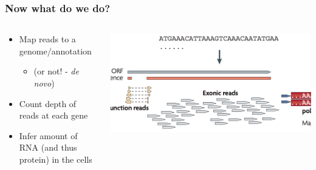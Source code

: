\documentclass[14pt]{beamer}
\begin{document}
\begin{frame}
\frametitle{Now what do we do?}
\begin{columns}
	\begin{column}{0.5\textwidth}
	\begin{itemize}
		\item<+-> Map reads to a genome/annotation
		\begin{itemize}
			\item (or not! - \textit{de novo})
		\end{itemize}
		\item<+-> Count depth of reads at each gene
		\item<+-> Infer amount of RNA (and thus protein) in the cells
	\end{itemize}
	\end{column}
	\begin{column}{0.5\textwidth}
	\begin{center}
    	\includegraphics[width=1\textwidth]{images_20170912_map.png}
    \end{center}
	\end{column}
\end{columns}
\end{frame}
\end{document}
